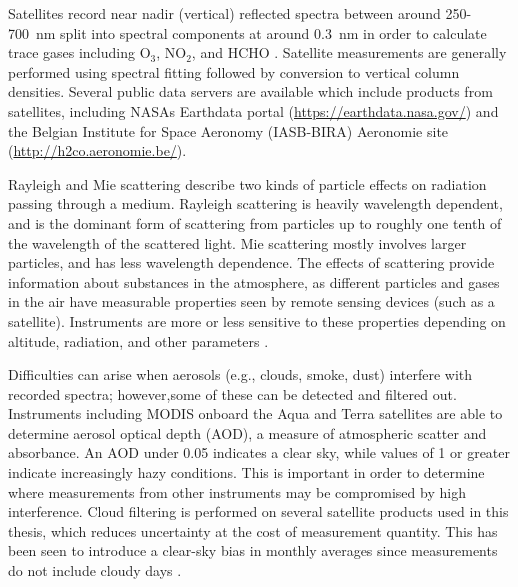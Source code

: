     Satellites record near nadir (vertical) reflected spectra between around 250-700~nm split into spectral components at around $0.3$~nm in order to calculate trace gases including O$_3$, NO$_2$, and HCHO \parencite[e.g.,][]{Leue2001}.
    Satellite measurements are generally performed using spectral fitting followed by conversion to vertical column densities.
    Several public data servers are available which include products from satellites, including NASAs Earthdata portal (\url{https://earthdata.nasa.gov/}) and the Belgian Institute for Space Aeronomy (IASB-BIRA) Aeronomie site (\url{http://h2co.aeronomie.be/}).
    
    
    Rayleigh and Mie scattering describe two kinds of particle effects on radiation passing through a medium.
    Rayleigh scattering is heavily wavelength dependent, and is the dominant form of scattering from particles up to roughly one tenth of the wavelength of the scattered light.
    Mie scattering mostly involves larger particles, and has less wavelength dependence.
    The effects of scattering provide information about substances in the atmosphere, as different particles and gases in the air have measurable properties seen by remote sensing devices (such as a satellite). 
    Instruments are more or less sensitive to these properties depending on altitude, radiation, and other parameters \parencite[e.g.,][]{Martin2002}.
    
    
    Difficulties can arise when aerosols (e.g., clouds, smoke, dust) interfere with recorded spectra; however,some of these can be detected and filtered out.
    Instruments including MODIS onboard the Aqua and Terra satellites are able to determine aerosol optical depth (AOD), a measure of atmospheric scatter and absorbance. 
    An AOD under 0.05 indicates a clear sky, while values of 1 or greater indicate increasingly hazy conditions.
    This is important in order to determine where measurements from other instruments may be compromised by high interference.
    Cloud filtering is performed on several satellite products used in this thesis, which reduces uncertainty at the cost of measurement quantity. 
    This has been seen to introduce a clear-sky bias in monthly averages since measurements do not include cloudy days \parencite{Surl2018}.
    
